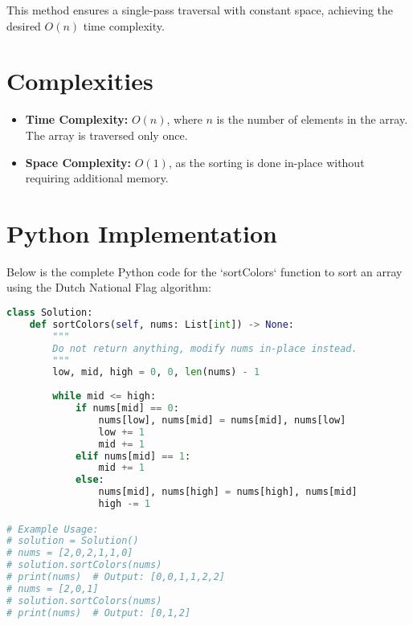 This method ensures a single-pass traversal with constant space, achieving the desired \(O(n)\) time complexity.


\section*{Complexities}

\begin{itemize}
    \item \textbf{Time Complexity:} \(O(n)\), where \(n\) is the number of elements in the array. The array is traversed only once.
    \item \textbf{Space Complexity:} \(O(1)\), as the sorting is done in-place without requiring additional memory.
\end{itemize}

\newpage %
\section*{Python Implementation}

Below is the complete Python code for the `sortColors` function to sort an array using the Dutch National Flag algorithm:

\begin{fullwidth}
\begin{lstlisting}[language=Python]
class Solution:
    def sortColors(self, nums: List[int]) -> None:
        """
        Do not return anything, modify nums in-place instead.
        """
        low, mid, high = 0, 0, len(nums) - 1
        
        while mid <= high:
            if nums[mid] == 0:
                nums[low], nums[mid] = nums[mid], nums[low]
                low += 1
                mid += 1
            elif nums[mid] == 1:
                mid += 1
            else:
                nums[mid], nums[high] = nums[high], nums[mid]
                high -= 1

# Example Usage:
# solution = Solution()
# nums = [2,0,2,1,1,0]
# solution.sortColors(nums)
# print(nums)  # Output: [0,0,1,1,2,2]
# nums = [2,0,1]
# solution.sortColors(nums)
# print(nums)  # Output: [0,1,2]
\end{lstlisting}
\end{fullwidth}

